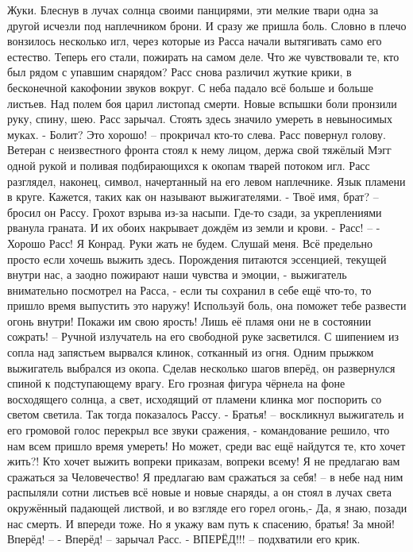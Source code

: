 \documentclass[a4paper, 12pt]{report}
\begin{document}
	Жуки. Блеснув в лучах солнца своими панцирями, эти мелкие твари одна за другой исчезли под наплечником брони.
	И сразу же пришла боль. Словно в плечо вонзилось несколько игл, через которые из Расса начали вытягивать само его естество. Теперь его стали, пожирать на самом деле. Что же чувствовали те, кто был рядом с упавшим снарядом? Расс снова различил жуткие крики, в бесконечной какофонии звуков вокруг.
	С неба падало всё больше и больше листьев. Над полем боя царил листопад смерти. Новые вспышки боли пронзили руку, спину, шею. Расс зарычал. Стоять здесь значило умереть в невыносимых муках.
	- Болит? Это хорошо! – прокричал кто-то слева. Расс повернул голову.
	Ветеран с неизвестного фронта стоял к нему лицом, держа свой тяжёлый Мэгг одной рукой и поливая подбирающихся к окопам тварей потоком игл. Расс разглядел, наконец, символ, начертанный на его левом наплечнике. Язык пламени в круге. Кажется, таких как он называют выжигателями.
	- Твоё имя, брат? – бросил он Рассу. 
Грохот взрыва из-за насыпи. Где-то сзади, за укреплениями рванула граната. И их обоих накрывает дождём из земли и крови. 
	- Расс! –
	- Хорошо Расс! Я Конрад. Руки жать не будем. Слушай меня. Всё предельно просто если хочешь выжить здесь. Порождения питаются эссенцией, текущей внутри нас, а заодно пожирают наши чувства и эмоции, - выжигатель внимательно посмотрел на Расса, - если ты сохранил в себе ещё что-то, то пришло время выпустить это наружу! Используй боль, она поможет тебе развести огонь внутри! Покажи им свою ярость! Лишь её пламя они не в состоянии сожрать! –
	Ручной излучатель на его свободной руке засветился. С шипением из сопла над запястьем вырвался клинок, сотканный из огня. Одним прыжком выжигатель выбрался из окопа. Сделав несколько шагов вперёд, он развернулся спиной к подступающему врагу. Его грозная фигура чёрнела на фоне восходящего солнца, а свет, исходящий от пламени клинка мог поспорить со светом светила. Так тогда показалось Рассу.
	- Братья! – воскликнул выжигатель и его громовой голос перекрыл все звуки сражения, - командование решило, что нам  всем пришло время умереть! Но может, среди вас ещё найдутся те, кто хочет жить?! Кто хочет выжить вопреки приказам, вопреки всему! Я не предлагаю вам сражаться за Человечество! Я предлагаю вам сражаться за себя! – в небе над ним распыляли сотни листьев всё новые и новые снаряды, а он стоял в лучах света окружённый падающей листвой, и во взгляде его горел огонь,- Да, я знаю, позади нас смерть. И впереди тоже. Но я укажу вам путь к спасению, братья! За мной! Вперёд! –
	- Вперёд! – зарычал Расс. 
- ВПЕРЁД!!! – подхватили его крик. 
\end{document}
